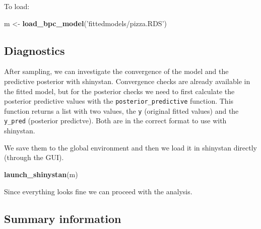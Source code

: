 \documentclass[
]{book}
\newenvironment{Shaded}{\begin{snugshade}}{\end{snugshade}}
\newcommand{\CommentTok}[1]{\textcolor[rgb]{0.56,0.35,0.01}{\textit{#1}}}
\newcommand{\KeywordTok}[1]{\textcolor[rgb]{0.13,0.29,0.53}{\textbf{#1}}}
\newcommand{\NormalTok}[1]{#1}
\newcommand{\OperatorTok}[1]{\textcolor[rgb]{0.81,0.36,0.00}{\textbf{#1}}}
\newcommand{\StringTok}[1]{\textcolor[rgb]{0.31,0.60,0.02}{#1}}
\begin{document}
To load:

\begin{Shaded}
\begin{Highlighting}[]
\NormalTok{m <-}\StringTok{ }\KeywordTok{load_bpc_model}\NormalTok{(}\StringTok{'fittedmodels/pizza.RDS'}\NormalTok{)}
\end{Highlighting}
\end{Shaded}

\hypertarget{diagnostics}{%
\subsection{Diagnostics}\label{diagnostics}}

After sampling, we can investigate the convergence of the model and the predictive posterior with shinystan.
Convergence checks are already available in the fitted model, but for the posterior checks we need to first calculate the posterior predictive values with the \texttt{posterior\_predictive} function. This function returns a list with two values, the \texttt{y} (original fitted values) and the \texttt{y\_pred} (posterior predictve). Both are in the correct format to use with shinystan.

We save them to the global environment and then we load it in shinystan directly (through the GUI).

\begin{Shaded}
\end{Shaded}

\begin{Shaded}
\begin{Highlighting}[]
\KeywordTok{launch_shinystan}\NormalTok{(m)}
\end{Highlighting}
\end{Shaded}

Since everything looks fine we can proceed with the analysis.

\hypertarget{summary-information}{%
\subsection{Summary information}\label{summary-information}}
\end{document}
